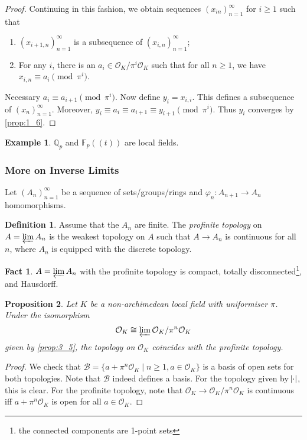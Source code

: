 \documentclass[11pt]{article}
\theoremstyle{definition}
\newtheorem{definition}{Definition}[subsection]
\newtheorem*{example}{Example}
\newtheorem*{fact}{Fact}
\theoremstyle{plain}
\newtheorem{proposition}[definition]{Proposition}
\theoremstyle{remark}
\newcommand{\FF}{\mathbb{F}}
\newcommand{\QQ}{\mathbb{Q}}
\newcommand{\cO}{\mathcal{O}}
\begin{document}
\begin{proof}
    Continuing in this fashion, we obtain sequences $(x_{in})_{n=1}^\infty$ for $i \ge 1$ such that
    \begin{enumerate}
        \item $(x_{i+1, n})_{n=1}^\infty$ is a subsequence of $(x_{i, n})_{n=1}^\infty$;
        \item For any $i$, there is an $a_i \in \cO_K / \pi^i \cO_K$ such that for all $n \ge 1$, we have $x_{i,n} \equiv a_i \pmod{\pi^i}$.
    \end{enumerate}
    Necessary $a_i \equiv a_{i+1} \pmod{\pi^i}$. Now define $y_i = x_{i,i}$. This defines a subsequence of $(x_n)_{n=1}^\infty$. Moreover, $y_i \equiv a_i \equiv a_{i+1} \equiv y_{i+1} \pmod{\pi^i}$. Thus $y_i$ converges by \autoref{prop:1_6}.
\end{proof}

\begin{example}
    $\QQ_p$ and $\FF_p((t))$ are local fields.
\end{example}

\subsubsection*{More on Inverse Limits}
Let $(A_n)_{n=1}^\infty$ be a sequence of sets/groups/rings and $\varphi_n : A_{n+1} \to A_n$ homomorphisms.

\begin{definition}\label{def:7_3}
    Assume that the $A_n$ are finite. The \emph{profinite topology} on $A = \varprojlim A_n$ is the weakest topology on $A$ such that $A \to A_n$ is continuous for all $n$, where $A_n$ is equipped with the discrete topology.
\end{definition}

\begin{fact}
    $A = \varprojlim A_n$ with the profinite topology is compact, totally disconnected\footnote{the connected components are 1-point sets}, and Hausdorff.
\end{fact}

\begin{proposition}\label{prop:7_4}
    Let $K$ be a non-archimedean local field with uniformiser $\pi$. Under the isomorphism
    \begin{equation*}
        \cO_K \cong \varprojlim \cO_K / \pi^n \cO_K
    \end{equation*}
    given by \autoref{prop:3_5}, the topology on $\cO_K$ coincides with the profinite topology.
\end{proposition}
\begin{proof}
    We check that $\mathcal{B} = \{a + \pi^n\cO_K \mid n \ge 1, a \in \cO_K\}$ is a basis of open sets for both topologies. Note that $\mathcal{B}$ indeed defines a basis. For the topology given by $\abs{\cdot}$, this is clear. For the profinite topology, note that $\cO_K \to \cO_K / \pi^n \cO_K$ is continuous iff $a + \pi^n \cO_K$ is open for all $a \in \cO_K$.
\end{proof}
\end{document}

